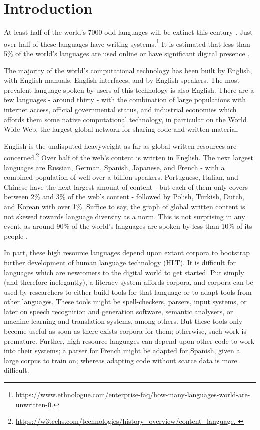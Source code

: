 \section{Introduction}
\label{sec:intro}

At least half of the world's 7000-odd languages will be extinct this century \citep{krauss92, grenoble2011cambridge}. Just over half of these languages have writing systems.\footnote{\href{https://www.ethnologue.com/enterprise-faq/how-many-languages-world-are-unwritten-0}{https://www.ethnologue.com/enterprise-faq/how-many-languages-world-are-unwritten-0}. } It is estimated that less than 5\% of the world's languages are used online or have significant digital presence \citep{kornai2013digital}.

The majority of the world's computational technology has been built by English, with English manuals, English interfaces, and by English speakers. The most prevalent language spoken by users of this technology is also English. There are a few languages - around thirty - with the combination of large populations with internet access, official governmental status, and industrial economies which affords them some native computational technology, in particular on the World Wide Web, the largest global network for sharing code and written material.

English is the undisputed heavyweight as far as global written resources are concerned.\footnote{\href{https://w3techs.com/technologies/history_overview/content_language}{https://w3techs.com/technologies/history\_overview/content\_language. }} Over half of the web's content is written in English. The next largest languages are Russian, German, Spanish, Japanese, and French - with a combined population of well over a billion speakers. Portuguese, Italian, and Chinese have the next largest amount of content - but each of them only covers between 2\% and 3\% of the web's content - followed by Polish, Turkish, Dutch, and Korean with over 1\%. Suffice to say, the graph of global written content is not skewed towards language diversity as a norm. This is not surprising in any event, as around 90\% of the world's languages are spoken by less than 10\% of its people \citep{bernard1992preserving}.

In part, these high resource languages depend upon extant corpora to bootstrap further development of human language technology (HLT). It is difficult for languages which are newcomers to the digital world to get started. %
Put simply (and therefore inelegantly), a literacy system affords corpora, and corpora can be used by researchers to either build tools for that language or to adapt tools from other languages. These tools might be spell-checkers, parsers, input systems, or later on speech recognition and generation software, semantic analysers, or machine learning and translation systems, among others. But these tools only become useful as soon as there exists corpora for them; otherwise, such work is premature. Further, high resource languages can depend upon other code to work into their systems; a parser for French might be adapted for Spanish, given a large corpus to train on; whereas adapting code without scarce data is more difficult.

